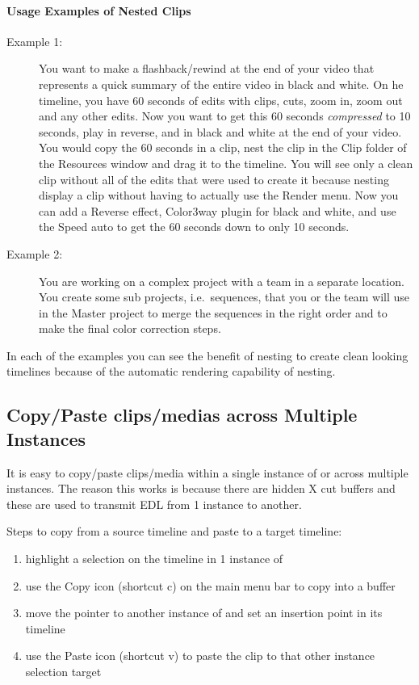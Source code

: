 \paragraph{Usage Examples of Nested Clips}

\begin{description}
\item[Example 1:] You want to make a flashback/rewind at the end
  of your video that represents a quick summary of the entire video in
  black and white. On he timeline, you have 60 seconds of edits with
  clips, cuts, zoom in, zoom out and any other edits. Now you want to
  get this 60 seconds \textit{compressed} to 10 seconds, play in
  reverse, and in black and white at the end of your video.  You would
  copy the 60 seconds in a clip, nest the clip in the Clip folder of
  the Resources window and drag it to the timeline. You will see only
  a clean clip without all of the edits that were used to create it
  because nesting display a clip without having to actually use the
  Render menu.  Now you can add a Reverse effect, Color3way plugin for
  black and white, and use the Speed auto to get the 60 seconds down
  to only 10 seconds.
\item[Example 2:] You are working on a complex project with a
  team in a separate location. You create some sub projects, i.e.\
  sequences, that you or the team will use in the Master project to
  merge the sequences in the right order and to make the final color
  correction steps.
\end{description}

In each of the examples you can see the benefit of nesting to create
clean looking timelines because of the automatic rendering
capability of nesting.


\subsection{Copy/Paste clips/medias across Multiple Instances}%
\label{sub:copy_paste_multiple_instances}

It is easy to copy/paste clips/media within a single instance of
\CGG{} or across multiple instances.  The reason this works is
because there are hidden X cut buffers and these are used to
transmit EDL from 1 instance to another.

Steps to copy from a source timeline and paste to a target timeline:

\begin{enumerate}
\item highlight a selection on the timeline in 1 instance of \CGG{}
\item use the Copy icon (shortcut c) on the main menu bar to copy
  into a buffer
\item move the pointer to another instance of \CGG{} and set an
  insertion point in its timeline
\item use the Paste icon (shortcut v) to paste the clip to that
  other instance selection target
\end{enumerate}


